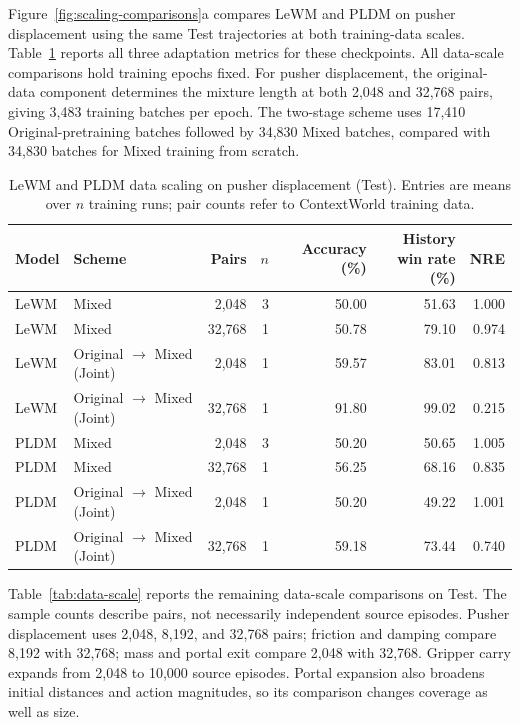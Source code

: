 Figure~\ref{fig:scaling-comparisons}a compares LeWM and PLDM on pusher displacement using the same Test trajectories at both training-data scales.
Table~\ref{tab:data-scale-test} reports all three adaptation metrics for these checkpoints.
All data-scale comparisons hold training epochs fixed.
For pusher displacement, the original-data component determines the mixture length at both 2,048 and 32,768 pairs, giving 3,483 training batches per epoch.
The two-stage scheme uses 17,410 Original-pretraining batches followed by 34,830 Mixed batches, compared with 34,830 batches for Mixed training from scratch.
\begingroup\small
\setlength{\tabcolsep}{5pt}
\begin{longtable}{@{}llrrrrr@{}}
\caption{LeWM and PLDM data scaling on pusher displacement (Test). Entries are means over $n$ training runs; pair counts refer to ContextWorld training data.}\label{tab:data-scale-test}\\
\toprule
Model & Scheme & Pairs & $n$ & Accuracy (\%) & \shortstack{History\\win rate (\%)} & NRE\\
\midrule

LeWM & Mixed & 2,048 & 3 & 50.00 & 51.63 & 1.000 \\
LeWM & Mixed & 32,768 & 1 & 50.78 & 79.10 & 0.974 \\
LeWM & Original $\rightarrow$ Mixed (Joint) & 2,048 & 1 & 59.57 & 83.01 & 0.813 \\
LeWM & Original $\rightarrow$ Mixed (Joint) & 32,768 & 1 & 91.80 & 99.02 & 0.215 \\
PLDM & Mixed & 2,048 & 3 & 50.20 & 50.65 & 1.005 \\
PLDM & Mixed & 32,768 & 1 & 56.25 & 68.16 & 0.835 \\
PLDM & Original $\rightarrow$ Mixed (Joint) & 2,048 & 1 & 50.20 & 49.22 & 1.001 \\
PLDM & Original $\rightarrow$ Mixed (Joint) & 32,768 & 1 & 59.18 & 73.44 & 0.740 \\
\bottomrule\end{longtable}\endgroup
Table~\ref{tab:data-scale} reports the remaining data-scale comparisons on Test.
The sample counts describe pairs, not necessarily independent source episodes.
Pusher displacement uses 2,048, 8,192, and 32,768 pairs; friction and damping compare 8,192 with 32,768; mass and portal exit compare 2,048 with 32,768.
Gripper carry expands from 2,048 to 10,000 source episodes.
Portal expansion also broadens initial distances and action magnitudes, so its comparison changes coverage as well as size.
